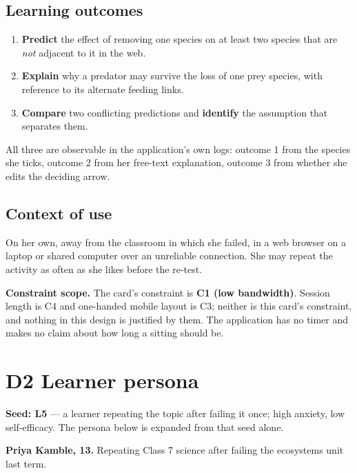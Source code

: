 \documentclass[11pt,a4paper]{article}
\begin{document}
\subsection*{Learning outcomes}

\begin{enumerate}[leftmargin=*,itemsep=2pt]
  \item \textbf{Predict} the effect of removing one species on at least two species that are
        \emph{not} adjacent to it in the web.
  \item \textbf{Explain} why a predator may survive the loss of one prey species, with reference
        to its alternate feeding links.
  \item \textbf{Compare} two conflicting predictions and \textbf{identify} the assumption that
        separates them.
\end{enumerate}

All three are observable in the application's own logs: outcome 1 from the species she ticks,
outcome 2 from her free-text explanation, outcome 3 from whether she edits the deciding arrow.

\subsection*{Context of use}

On her own, away from the classroom in which she failed, in a web browser on a laptop or
shared computer over an unreliable connection. She may repeat the activity as often as she
likes before the re-test.

\textbf{Constraint scope.} The card's constraint is \textbf{C1 (low bandwidth)}. Session length
is C4 and one-handed mobile layout is C3; neither is this card's constraint, and nothing in this
design is justified by them. The application has no timer and makes no claim about how long a
sitting should be.

\section{D2 \quad Learner persona}

\textbf{Seed: L5} --- a learner repeating the topic after failing it once; high anxiety, low
self-efficacy. The persona below is expanded from that seed alone.

\textbf{Priya Kamble, 13.} Repeating Class 7 science after failing the ecosystems unit last term.
\end{document}
